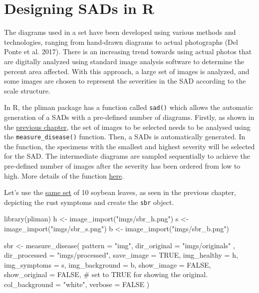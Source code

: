 \documentclass[
  letterpaper,
  DIV=11,
  numbers=noendperiod]{scrreprt}
\newenvironment{Shaded}{\begin{snugshade}}{\end{snugshade}}
\newcommand{\AttributeTok}[1]{\textcolor[rgb]{0.40,0.45,0.13}{#1}}
\newcommand{\CommentTok}[1]{\textcolor[rgb]{0.37,0.37,0.37}{#1}}
\newcommand{\ConstantTok}[1]{\textcolor[rgb]{0.56,0.35,0.01}{#1}}
\newcommand{\FunctionTok}[1]{\textcolor[rgb]{0.28,0.35,0.67}{#1}}
\newcommand{\NormalTok}[1]{\textcolor[rgb]{0.00,0.23,0.31}{#1}}
\newcommand{\OtherTok}[1]{\textcolor[rgb]{0.00,0.23,0.31}{#1}}
\newcommand{\StringTok}[1]{\textcolor[rgb]{0.13,0.47,0.30}{#1}}
\begin{document}
\hypertarget{designing-sads-in-r}{%
\section{Designing SADs in R}\label{designing-sads-in-r}}

The diagrams used in a set have been developed using various methods and
technologies, ranging from hand-drawn diagrams to actual photographs
(Del Ponte et al. 2017). There is an increasing trend towards using
actual photos that are digitally analyzed using standard image analysis
software to determine the percent area affected. With this approach, a
large set of images is analyzed, and some images are chosen to represent
the severities in the SAD according to the scale structure.

In R, the pliman package has a function called \texttt{sad()} which
allows the automatic generation of a SADs with a pre-defined number of
diagrams. Firstly, as shown in the
\href{data-actual-severity.html}{previous chapter}, the set of images to
be selected needs to be analysed using the \texttt{measure\_disease()}
function. Then, a SADs is automatically generated. In the function, the
specimens with the smallest and highest severity will be selected for
the SAD. The intermediate diagrams are sampled sequentially to achieve
the pre-defined number of images after the severity has been ordered
from low to high. More details of the function
\href{https://tiagoolivoto.github.io/pliman/reference/sad.html}{here}.

Let's use the \protect\hyperlink{multiple-images}{same set} of 10
soybean leaves, as seen in the previous chapter, depicting the rust
symptoms and create the \texttt{sbr} object.

\begin{Shaded}
\begin{Highlighting}[]
\FunctionTok{library}\NormalTok{(pliman)}
\NormalTok{h }\OtherTok{\textless{}{-}} \FunctionTok{image\_import}\NormalTok{(}\StringTok{"imgs/sbr\_h.png"}\NormalTok{)}
\NormalTok{s }\OtherTok{\textless{}{-}} \FunctionTok{image\_import}\NormalTok{(}\StringTok{"imgs/sbr\_s.png"}\NormalTok{)}
\NormalTok{b }\OtherTok{\textless{}{-}} \FunctionTok{image\_import}\NormalTok{(}\StringTok{"imgs/sbr\_b.png"}\NormalTok{)}

\NormalTok{sbr }\OtherTok{\textless{}{-}} \FunctionTok{measure\_disease}\NormalTok{(}
  \AttributeTok{pattern =} \StringTok{"img"}\NormalTok{,}
  \AttributeTok{dir\_original =} \StringTok{"imgs/originals"}\NormalTok{ ,}
  \AttributeTok{dir\_processed =} \StringTok{"imgs/processed"}\NormalTok{,}
  \AttributeTok{save\_image =} \ConstantTok{TRUE}\NormalTok{,}
  \AttributeTok{img\_healthy =}\NormalTok{ h,}
  \AttributeTok{img\_symptoms =}\NormalTok{ s,}
  \AttributeTok{img\_background =}\NormalTok{ b,}
  \AttributeTok{show\_image =} \ConstantTok{FALSE}\NormalTok{,}
  \AttributeTok{show\_original =} \ConstantTok{FALSE}\NormalTok{, }\CommentTok{\# set to TRUE for showing the original.}
  \AttributeTok{col\_background =} \StringTok{"white"}\NormalTok{, }
  \AttributeTok{verbose =} \ConstantTok{FALSE}
\NormalTok{)}
\end{Highlighting}
\end{Shaded}
\end{document}
